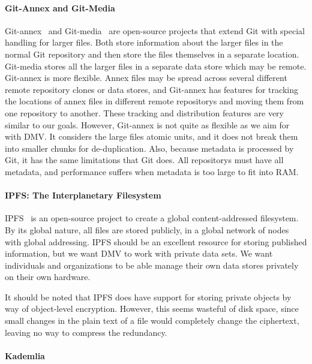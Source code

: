 \paragraph{Git-Annex and Git-Media}

Git-annex~\cite{git_annex_homepage} and Git-media~\cite{git_media_github} are open-source projects that extend Git with special handling for larger files.
Both store information about the larger files in the normal Git \gls{repository} and then store the files themselves in a separate location.
Git-media stores all the larger files in a separate data store which may be remote.
Git-annex is more flexible.
Annex files may be spread across several different remote \gls{repository} clones or data stores, and Git-annex has features for tracking the locations of annex files in different remote \glspl{repository} and moving them from one \gls{repository} to another.
These tracking and distribution features are very similar to our goals.
However, Git-annex is not quite as flexible as we aim for with \gls{DMV}.
It considers the large files atomic units, and it does not break them into smaller chunks for de-duplication.
Also, because metadata is processed by Git, it has the same limitations that Git does.
All \glspl{repository} must have all metadata, and performance suffers when metadata is too large to fit into RAM.


\paragraph{IPFS: The Interplanetary Filesystem}

IPFS~\cite{ipfs_github_main} is an open-source pro\-ject to create a global content-addressed filesystem.
By its global nature, all files are stored publicly, in a global network of nodes with global addressing.
IPFS should be an excellent resource for storing published information, but we want \gls{DMV} to work with private data sets.
We want individuals and organizations to be able manage their own data stores privately on their own hardware.

It should be noted that IPFS does have support for storing private objects by way of object-level encryption.
However, this seems wasteful of disk space, since small changes in the plain text of a file would completely change the ciphertext, leaving no way to compress the redundancy.


\paragraph{Kademlia}

